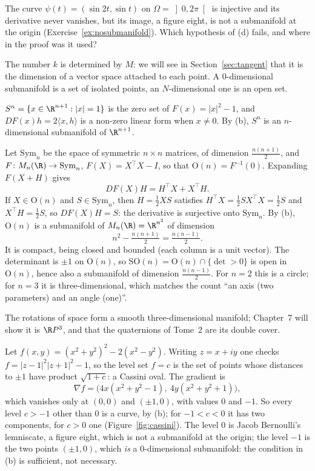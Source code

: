 \begin{think}
The curve $\psi(t)=(\sin2t,\sin t)$ on $\Omega=\left]0,2\pi\right[$ is injective and its derivative never vanishes, but its image, a figure eight, is not a
submanifold at the origin (Exercise~\ref{ex:nosubmanifold}). Which hypothesis of (d) fails, and where in the proof was it used?
\end{think}

The number $k$ is determined by $M$: we will see in Section~\ref{sec:tangent} that it is the dimension of a vector space attached to each point. A
$0$-dimensional submanifold is a set of isolated points, an $N$-dimensional one is an open set.

\begin{example}[spheres]\label{ex:spheres}
$S^n=\{x\in\R^{n+1}:|x|=1\}$ is the zero set of $F(x)=|x|^2-1$, and $DF(x)h=2\langle x,h\rangle$ is a non-zero linear form when $x\ne0$. By (b), $S^n$ is an
$n$-dimensional submanifold of $\R^{n+1}$.
\end{example}

\begin{example}\label{ex:on}
Let $\mathrm{Sym}_n$ be the space of symmetric $n\times n$ matrices, of dimension $\frac{n(n+1)}2$, and $F\colon M_n(\R)\to\mathrm{Sym}_n$,
$F(X)=X^\top X-I$, so that $\mathrm O(n)=F^{-1}(0)$. Expanding $F(X+H)$ gives
\[
DF(X)H=H^\top X+X^\top H.
\]
If $X\in\mathrm O(n)$ and $S\in\mathrm{Sym}_n$, then $H=\frac12XS$ satisfies $H^\top X=\frac12SX^\top X=\frac12S$ and $X^\top H=\frac12S$, so
$DF(X)H=S$: the derivative is surjective onto $\mathrm{Sym}_n$. By (b), $\mathrm O(n)$ is a submanifold of $M_n(\R)=\R^{n^2}$ of dimension
\[
n^2-\tfrac{n(n+1)}2=\tfrac{n(n-1)}2.
\]
It is compact, being closed and bounded (each column is a unit vector). The determinant is $\pm1$ on $\mathrm O(n)$, so $\mathrm{SO}(n)=\mathrm O(n)\cap\{\det>0\}$
is open in $\mathrm O(n)$, hence also a submanifold of dimension $\frac{n(n-1)}2$. For $n=2$ this is a circle; for $n=3$ it is three-dimensional, which
matches the count ``an axis (two parameters) and an angle (one)''.
\end{example}

The rotations of space form a smooth three-dimensional manifold; Chapter~7 will show it is $\R P^3$, and that the quaternions of Tome~2 are its double
cover.

\begin{example}\label{ex:cassini}
Let $f(x,y)=(x^2+y^2)^2-2(x^2-y^2)$. Writing $z=x+iy$ one checks $f=|z-1|^2|z+1|^2-1$, so the level set $f=c$ is the set of points whose distances to
$\pm1$ have product $\sqrt{1+c}$: a Cassini oval. The gradient is
\[
\nabla f=\bigl(4x(x^2+y^2-1),\ 4y(x^2+y^2+1)\bigr),
\]
which vanishes only at $(0,0)$ and $(\pm1,0)$, with values $0$ and $-1$. So every level $c>-1$ other than $0$ is a curve, by (b); for
$-1<c<0$ it has two components, for $c>0$ one (Figure~\ref{fig:cassini}). The level $0$ is Jacob Bernoulli's lemniscate, a figure eight, which is not a
submanifold at the origin; the level $-1$ is the two points $(\pm1,0)$, which \emph{is} a $0$-dimensional submanifold: the condition in (b) is
sufficient, not necessary.
\end{example}

